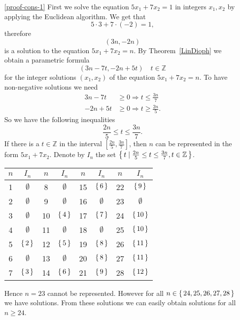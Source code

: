 \begin{enumerate}
\item[\ref{proof-cons-1}] First we solve the equation $5x_1+7x_2=1$ in integers $x_1,x_2$ by applying
the Euclidean algorithm. We get that 
$$
5\cdot 3+7\cdot(-2)=1,
$$
therefore 
$$
(3n,-2n)
$$
is a solution to the equation $5x_1+7x_2=n$. By Theorem~\ref{LinDioph} we obtain a parametric formula 
$$
(3n-7t,-2n+5t)\quad t\in\mathbb{Z}
$$
for the integer solutions $(x_1,x_2)$ of the equation $5x_1+7x_2=n$. To have non-negative solutions we need
\begin{align*}
3n-7t&\geq 0\Rightarrow t\leq \frac{3n}{7}\\
-2n+5t&\geq 0\Rightarrow t\geq \frac{2n}{5}.
\end{align*}
So we have the following inequalities
$$
\frac{2n}{5}\leq t\leq \frac{3n}{7}.
$$
If there is a $t\in\mathbb{Z}$ in the interval $[\frac{2n}{5},\frac{3n}{7}]$, then $n$ can be represented
in the form $5x_1+7x_2$. Denote by $I_n$ the set $\left\{\,t\mid \frac{2n}{5}\leq t\leq \frac{3n}{7}, t\in\mathbb{Z}\,\right\}$. 
\begin{center}
\begin{tabular}{|c|c||c|c||c|c||c|c|}
\hline
$n$ & $I_n$ & $n$ & $I_n$ & $n$ & $I_n$ & $n$ & $I_n$\\
\hline
1 & $\emptyset$ & 8 & $\emptyset$ &15 & $\left\{\, 6 \,\right\}$ &22 & $\left\{\, 9 \,\right\}$\\
\hline
2 & $\emptyset$ & 9 & $\emptyset$ &16 & $\emptyset$ &23 & $\emptyset$\\
\hline
3 & $\emptyset$ &10 & $\left\{\, 4 \,\right\}$ &17 & $\left\{\, 7 \,\right\}$ &24 & $\left\{\, 10 \,\right\}$\\
\hline
4 & $\emptyset$ &11 & $\emptyset$ &18 & $\emptyset$ &25 & $\left\{\, 10 \,\right\}$\\
\hline
5 & $\left\{\, 2 \,\right\}$ &12 & $\left\{\, 5 \,\right\}$ &19 & $\left\{\, 8 \,\right\}$ &26 & $\left\{\, 11 \,\right\}$\\
\hline
6 & $\emptyset$ &13 & $\emptyset$ &20 & $\left\{\, 8 \,\right\}$ &27 & $\left\{\, 11 \,\right\}$\\
\hline
7 & $\left\{\, 3 \,\right\}$ &14 & $\left\{\, 6 \,\right\}$ &21 & $\left\{\, 9 \,\right\}$ &28 & $\left\{\, 12 \,\right\}$\\
\hline
\end{tabular}
\end{center}
Hence $n=23$ cannot be represented. However for all $n\in\left\{\,24,25,26,27,28\,\right\}$ we have 
solutions. From these solutions we can easily obtain solutions for all $n\geq 24$.


\end{enumerate}
